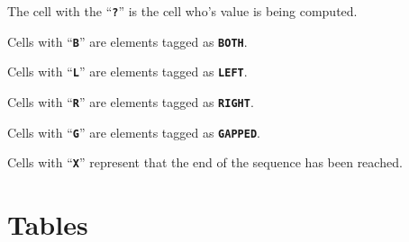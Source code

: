 \documentclass{bmcart}
\begin{document}
\begin{backmatter}
	The cell with the ``\textbf{\texttt{?}}'' is the cell who's value is being computed.

	Cells with ``\textbf{\texttt{B}}'' are elements tagged as \textbf{\texttt{BOTH}}.

	Cells with ``\textbf{\texttt{L}}'' are elements tagged as \textbf{\texttt{LEFT}}.

	Cells with ``\textbf{\texttt{R}}'' are elements tagged as \textbf{\texttt{RIGHT}}.

	Cells with ``\textbf{\texttt{G}}'' are elements tagged as \textbf{\texttt{GAPPED}}.

	Cells with ``\textbf{\texttt{X}}'' represent that the end of the sequence has been reached.
	
    \newpage
    
    
    \section*{Tables}
    

\end{backmatter}
\end{document}
